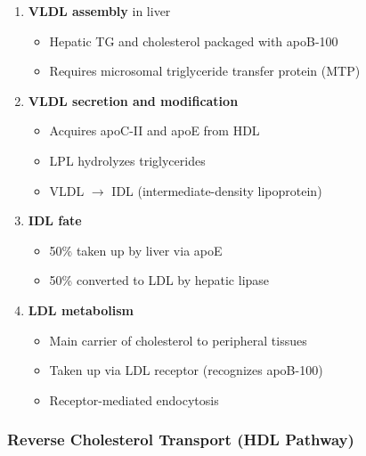 \begin{enumerate}
    \item \textbf{VLDL assembly} in liver
    \begin{itemize}
        \item Hepatic TG and cholesterol packaged with apoB-100
        \item Requires microsomal triglyceride transfer protein (MTP)
    \end{itemize}
    
    \item \textbf{VLDL secretion and modification}
    \begin{itemize}
        \item Acquires apoC-II and apoE from HDL
        \item LPL hydrolyzes triglycerides
        \item VLDL $\rightarrow$ IDL (intermediate-density lipoprotein)
    \end{itemize}
    
    \item \textbf{IDL fate}
    \begin{itemize}
        \item 50\% taken up by liver via apoE
        \item 50\% converted to LDL by hepatic lipase
    \end{itemize}
    
    \item \textbf{LDL metabolism}
    \begin{itemize}
        \item Main carrier of cholesterol to peripheral tissues
        \item Taken up via LDL receptor (recognizes apoB-100)
        \item Receptor-mediated endocytosis
    \end{itemize}
\end{enumerate}

\subsubsection{Reverse Cholesterol Transport (HDL Pathway)}


